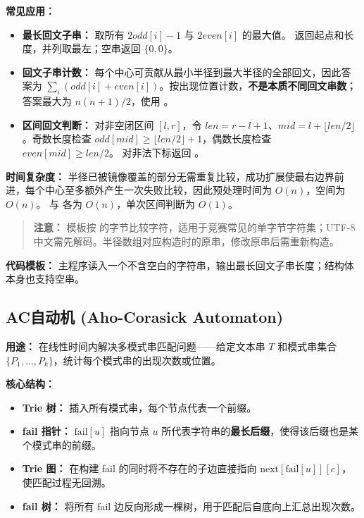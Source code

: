 \textbf{常见应用：}
\begin{itemize}
  \item \textbf{最长回文子串：} 取所有 $2odd[i]-1$ 与 $2even[i]$ 的最大值。 返回起点和长度，并列取最左；空串返回 $\{0,0\}$。
  \item \textbf{回文子串计数：} 每个中心可贡献从最小半径到最大半径的全部回文，因此答案为 $\sum_i (odd[i]+even[i])$。按出现位置计数，\textbf{不是本质不同回文串数}；答案最大为 $n(n+1)/2$，使用 。
  \item \textbf{区间回文判断：} 对非空闭区间 $[l,r]$，令 $len=r-l+1$、$mid=l+\lfloor len/2\rfloor$。奇数长度检查 $odd[mid]\ge\lfloor len/2\rfloor+1$，偶数长度检查 $even[mid]\ge len/2$。 对非法下标返回 。
\end{itemize}

\textbf{时间复杂度：} 半径已被镜像覆盖的部分无需重复比较，成功扩展使最右边界前进，每个中心至多额外产生一次失败比较，因此预处理时间为 $O(n)$，空间为 $O(n)$。 与  各为 $O(n)$，单次区间判断为 $O(1)$。

\begin{quote}
\textbf{注意：} 模板按  的字节比较字符，适用于竞赛常见的单字节字符集；UTF-8 中文需先解码。半径数组对应构造时的原串，修改原串后需重新构造。
\end{quote}

\textbf{代码模板：} 主程序读入一个不含空白的字符串，输出最长回文子串长度；结构体本身也支持空串。



\subsection{AC自动机 (Aho-Corasick Automaton)}

\textbf{用途：} 在线性时间内解决多模式串匹配问题——给定文本串 $T$ 和模式串集合 $\{P_1,\dots,P_k\}$，统计每个模式串的出现次数或位置。

\textbf{核心结构：}
\begin{itemize}
  \item \textbf{Trie 树：} 插入所有模式串，每个节点代表一个前缀。
  \item \textbf{fail 指针：} $\text{fail}[u]$ 指向节点 $u$ 所代表字符串的\textbf{最长后缀}，使得该后缀也是某个模式串的前缀。
  \item \textbf{Trie 图：} 在构建 fail 的同时将不存在的子边直接指向 $\text{next}[\text{fail}[u]][c]$，使匹配过程无回溯。
  \item \textbf{fail 树：} 将所有 fail 边反向形成一棵树，用于匹配后自底向上汇总出现次数。
\end{itemize}

